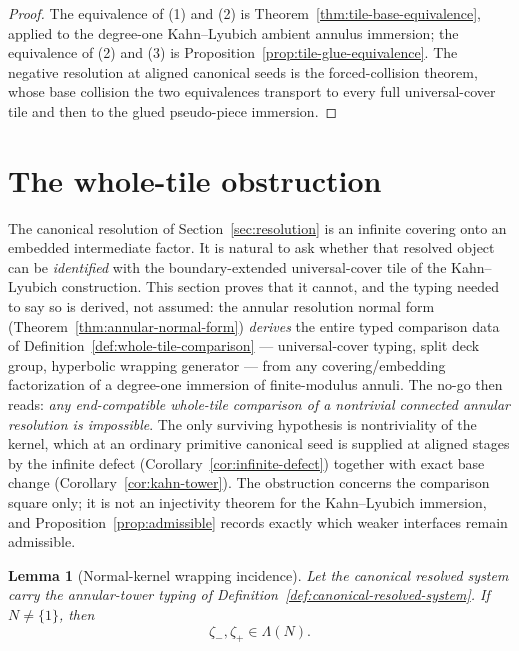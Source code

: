 \documentclass[11pt,reqno]{amsart}
\newtheorem{lemma}[theorem]{Lemma}
\theoremstyle{definition}
\theoremstyle{remark}
\begin{document}
\begin{proof}
The equivalence of (1) and (2) is
Theorem~\ref{thm:tile-base-equivalence}, applied to the degree-one
Kahn--Lyubich ambient annulus immersion; the equivalence of (2) and (3) is
Proposition~\ref{prop:tile-glue-equivalence}.  The negative resolution
at aligned canonical seeds is the forced-collision theorem, whose base
collision the two equivalences transport to every full universal-cover
tile and then to the glued pseudo-piece immersion.
\end{proof}

\section{The whole-tile obstruction}
\label{sec:wholetile}

The canonical resolution of Section~\ref{sec:resolution} is an infinite
covering onto an embedded intermediate factor.  It is natural to ask
whether that resolved object can be \emph{identified} with the
boundary-extended universal-cover tile of the Kahn--Lyubich
construction.  This section proves that it cannot, and the typing
needed to say so is derived, not assumed: the annular resolution
normal form (Theorem~\ref{thm:annular-normal-form}) \emph{derives} the
entire typed comparison data of
Definition~\ref{def:whole-tile-comparison} --- universal-cover typing,
split deck group, hyperbolic wrapping generator --- from any
covering/embedding factorization of a degree-one immersion of
finite-modulus annuli.  The no-go then reads: \emph{any end-compatible
whole-tile comparison of a nontrivial connected annular resolution is
impossible}.  The only surviving hypothesis is nontriviality of the
kernel, which at an ordinary primitive canonical seed is supplied at
aligned stages by the infinite defect
(Corollary~\ref{cor:infinite-defect}) together with exact base change
(Corollary~\ref{cor:kahn-tower}).  The obstruction concerns the
comparison
square only; it is not an injectivity theorem for the Kahn--Lyubich
immersion, and Proposition~\ref{prop:admissible} records exactly which
weaker interfaces remain admissible.



\begin{lemma}[Normal-kernel wrapping incidence]\label{lem:wrapping}
Let the canonical resolved system carry the annular-tower typing of Definition~\ref{def:canonical-resolved-system}.  If \(N\ne\{1\}\), then
\begin{equation}\label{eq:wrapping-in-limit-set}
\zeta_-,\zeta_+\in\Lambda(N).
\end{equation}
\end{lemma}
\end{document}
